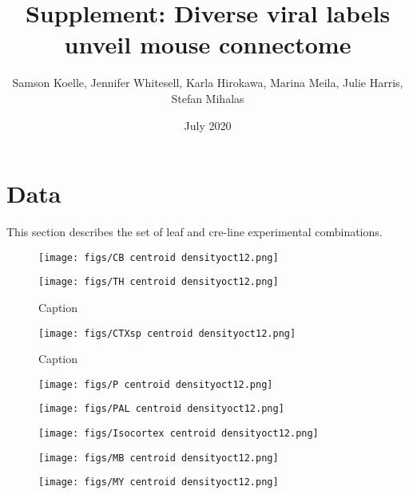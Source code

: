 \documentclass{article}
\title{Supplement: Diverse viral labels unveil mouse connectome}
\author{Samson Koelle, Jennifer Whitesell, Karla Hirokawa,  Marina Meila, Julie Harris, Stefan Mihalas}
\date{July 2020}
\begin{document}
\maketitle

\section{Data}
\label{supp_sec:data}

This section describes the set of leaf and cre-line experimental combinations.

\newpage

\begin{figure}[H]
    \centering
    \texttt{[image: figs/CB centroid densityoct12.png]}
    \label{fig:my_label}
\end{figure}
\newpage

\begin{figure}[H]
    \centering
    \texttt{[image: figs/TH centroid densityoct12.png]}
    \caption{Caption}
    \label{fig:my_label}
\end{figure}
\newpage

\begin{figure}[H]
    \centering
    \texttt{[image: figs/CTXsp centroid densityoct12.png]}
    \caption{Caption}
    \label{fig:my_label}
\end{figure}
\newpage

\begin{figure}[H]
    \centering
    \texttt{[image: figs/P centroid densityoct12.png]}
    \label{fig:my_label}
\end{figure}
\newpage

\begin{figure}[H]
    \centering
    \texttt{[image: figs/PAL centroid densityoct12.png]} 
    \label{fig:my_label}
\end{figure}
\newpage

\begin{figure}[H]
    \centering
    \texttt{[image: figs/Isocortex centroid densityoct12.png]}
    \label{fig:my_label}
\end{figure}
\newpage

\begin{figure}[H]
    \centering
    \texttt{[image: figs/MB centroid densityoct12.png]} 
    \label{fig:my_label}
\end{figure}
\newpage

\begin{figure}[H]
    \centering
    \texttt{[image: figs/MY centroid densityoct12.png]} 
    \label{fig:my_label}
\end{figure}
\newpage
\end{document}
